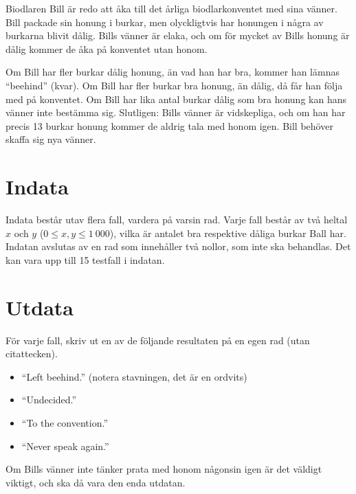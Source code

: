 

Biodlaren Bill är redo att åka till det årliga biodlarkonventet med sina
vänner. Bill packade sin honung i burkar, men olyckligtvis har honungen
i några av burkarna blivit dålig. Bills vänner är elaka, och om för
mycket av Bills honung är dålig kommer de åka på konventet utan honom.

Om Bill har fler burkar dålig honung, än vad han har bra, kommer han
lämnas ``beehind'' (kvar).
Om Bill har fler burkar bra honung, än dålig, då får han följa med på
konventet.
Om Bill har lika antal burkar dålig som bra honung kan hans vänner inte
bestämma sig. Slutligen: Bills vänner är vidskepliga, och om han har
precis 13 burkar honung kommer de aldrig tala med honom igen. Bill
behöver skaffa sig nya vänner.

\section*{Indata}

Indata består utav flera fall, vardera på varsin rad. Varje fall består
av två heltal $x$ och $y$ ($0 \le x, y \le 1~000$), vilka är antalet
bra respektive dåliga burkar Ball har. Indatan avslutas av en rad som
innehåller två nollor, som inte ska behandlas. Det kan vara upp till
15 testfall i indatan.

\section*{Utdata}

För varje fall, skriv ut en av de följande resultaten på en egen rad
(utan citattecken).
\begin{itemize}
    \item ``Left beehind.'' (notera stavningen, det är en ordvits)
    \item ``Undecided.''
    \item ``To the convention.''
    \item ``Never speak again.''
\end{itemize}
Om Bills vänner inte tänker prata med honom någonsin igen är det
väldigt viktigt, och ska då vara den enda utdatan.
